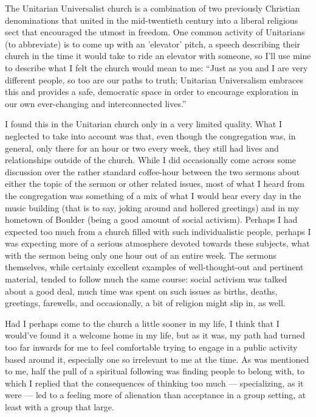 \documentclass{book}
\begin{document}
The Unitarian Universalist church is a combination of two previously Christian denominations that united in the mid-twentieth century into a liberal religious sect that encouraged the utmost in freedom.  One common activity of Unitarians (to abbreviate) is to come up with an 'elevator' pitch, a speech describing their church in the time it would take to ride an elevator with someone, so I'll use mine to describe what I felt the church would mean to me: ``Just as you and I are very different people, so too are our paths to truth; Unitarian Universalism embraces this and provides a safe, democratic space in order to encourage exploration in our own ever-changing and interconnected lives.''

I found this in the Unitarian church only in a very limited quality.  What I neglected to take into account was that, even though the congregation was, in general, only there for an hour or two every week, they still had lives and relationships outside of the church.  While I did occasionally come across some discussion over the rather standard coffee-hour between the two sermons about either the topic of the sermon or other related issues, most of what I heard from the congregation was something of a mix of what I would hear every day in the music building (that is to say, joking around and hollered greetings) and in my hometown of Boulder (being a good amount of social activism).  Perhaps I had expected too much from a church filled with such individualistic people, perhaps I was expecting more of a serious atmosphere devoted towards these subjects, what with the sermon being only one hour out of an entire week.  The sermons themselves, while certainly excellent examples of well-thought-out and pertinent material, tended to follow much the same course: social activism was talked about a good deal, much time was spent on such issues as births, deaths, greetings, farewells, and occasionally, a bit of religion might slip in, as well.

Had I perhaps come to the church a little sooner in my life, I think that I would've found it a welcome home in my life, but as it was, my path had turned too far inwards for me to feel comfortable trying to engage in a public activity based around it, especially one so irrelevant to me at the time.  As was mentioned to me, half the pull of a spiritual following was finding people to belong with, to which I replied that the consequences of thinking too much --- specializing, as it were --- led to a feeling more of alienation than acceptance in a group setting, at least with a group that large.
\end{document}

